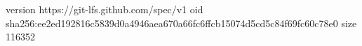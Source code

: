 version https://git-lfs.github.com/spec/v1
oid sha256:ee2ed192816c5839d0a4946aea670a66fc6ffcb15074d5cd5c84f69fc60c78e0
size 116352
